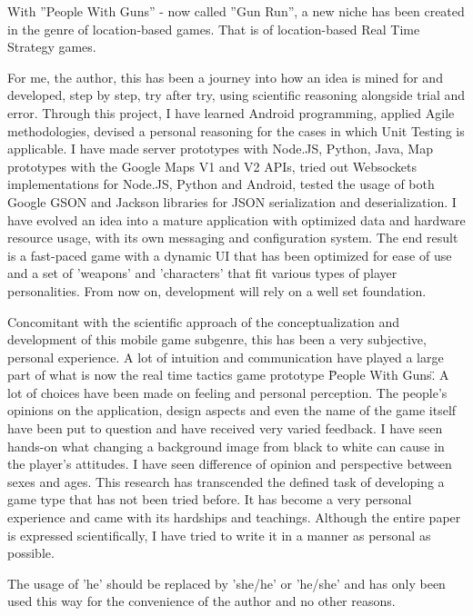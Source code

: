 With ''People With Guns'' - now called ''Gun Run'', a new niche has been created
in the genre of location-based games. That is of location-based Real Time
Strategy games.\newline

For me, the author, this has been a journey into how an idea is mined for and
developed, step by step, try after try, using scientific reasoning
alongside trial and error. Through this project, I have learned Android
programming, applied Agile methodologies, devised a personal reasoning for the
cases in which Unit Testing is applicable. I have made server prototypes with
Node.JS, Python, Java, Map prototypes with the Google Maps V1 and V2 APIs, tried
out Websockets implementations for Node.JS, Python and Android, tested the usage
of both Google GSON and Jackson libraries for JSON serialization and
deserialization. I have evolved an idea into a mature application with optimized
data and hardware resource usage, with its own messaging and configuration
system. The end result is a fast-paced game with a dynamic UI that has been
optimized for ease of use and a set of 'weapons' and 'characters' that fit
various types of player personalities. From now on, development will rely on a
well set foundation.\newline


Concomitant with the scientific approach of the conceptualization and
development of this mobile game subgenre, this has been a very subjective,
personal experience. A lot of intuition and communication have played a large
part of what is now the real time tactics game prototype \"People With Guns\" .
A lot of choices have been made on feeling and personal perception. The people's
opinions on the application, design aspects and even the name of the game itself
have been put to question and have received very varied feedback. I have seen
hands-on what changing a background image from black to white can cause in the
player's attitudes. I have seen difference of opinion and perspective between
sexes and ages. This research has transcended the defined task of developing a
game type that has not been tried before. It has become a very personal
experience and came with its hardships and teachings. Although the entire paper
is expressed scientifically, I have tried to write it in a manner as personal as
possible.\newline

The usage of 'he' should be replaced by 'she/he' or 'he/she' and has only been
used this way for the convenience of the author and no other reasons.

